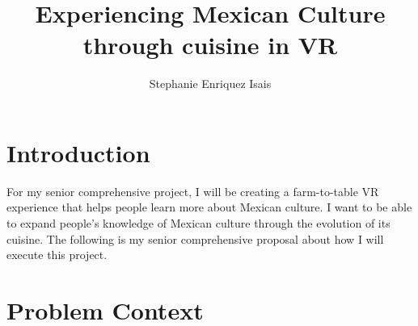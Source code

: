 \documentclass[11pt,twocolumn]{article}
\title{Experiencing Mexican Culture through cuisine in VR}
\author{Stephanie Enriquez Isais}
\affiliation{Occidental College}
\begin{document}
\maketitle

\section{Introduction}
For my senior comprehensive project, I will be creating a farm-to-table VR experience that helps people learn more about Mexican culture. I want to be able to expand people's knowledge of Mexican culture through the evolution of its cuisine. The following is my senior comprehensive proposal about how I will execute this project.

\section{Problem Context}
\end{document}
